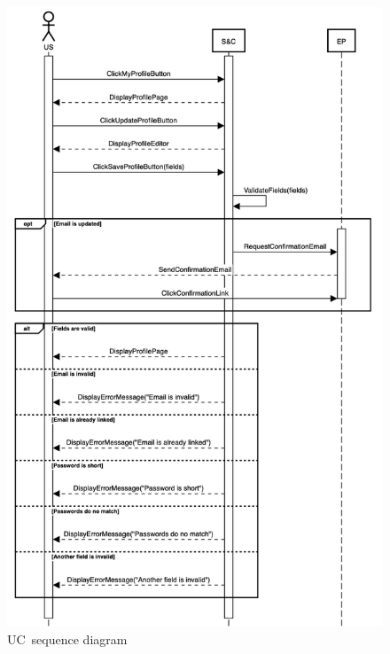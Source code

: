 \begin{figure}
    \centering
    \includegraphics[width=14cm]{images/sequence-diagrams/student-updates-profile.png}
    \caption{UC\theuc\ sequence diagram}
\end{figure}


